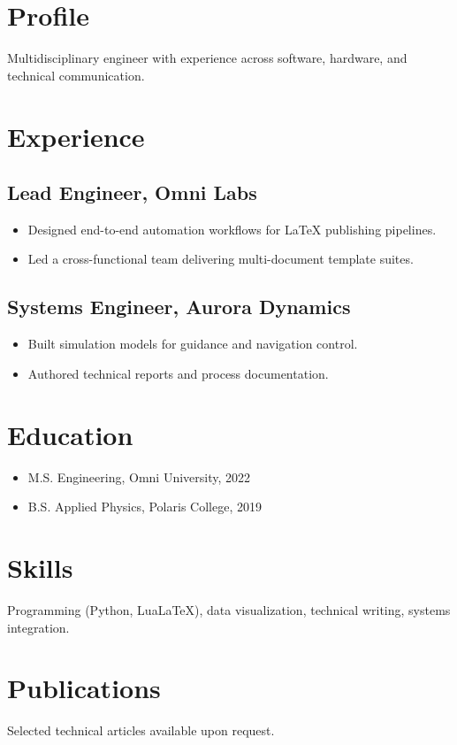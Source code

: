 \documentclass[
    language=english,
    doctype=cv,
    institution=none,
    titlestyle=cv
]{../../omnilatex}
\begin{document}
\maketitle

\section*{Profile}
Multidisciplinary engineer with experience across software, hardware, and technical communication.

\section*{Experience}
\subsection*{Lead Engineer, Omni Labs}
\begin{itemize}
    \item Designed end-to-end automation workflows for LaTeX publishing pipelines.
    \item Led a cross-functional team delivering multi-document template suites.
\end{itemize}

\subsection*{Systems Engineer, Aurora Dynamics}
\begin{itemize}
    \item Built simulation models for guidance and navigation control.
    \item Authored technical reports and process documentation.
\end{itemize}

\section*{Education}
\begin{itemize}
    \item M.S. Engineering, Omni University, 2022
    \item B.S. Applied Physics, Polaris College, 2019
\end{itemize}

\section*{Skills}
Programming (Python, LuaLaTeX), data visualization, technical writing, systems integration.

\section*{Publications}
Selected technical articles available upon request.
\end{document}
